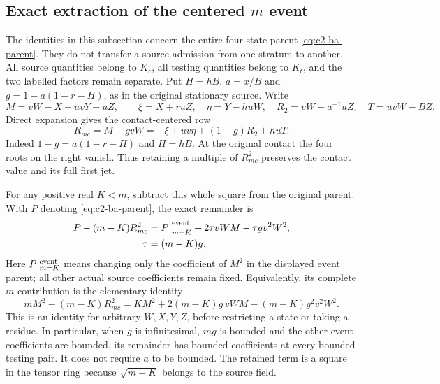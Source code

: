 \subsection{Exact extraction of the centered $m$ event}
\label{component:p8da9ea6ed9e5}
\label{p8da9ea6ed9e5:sec:r17-r5}

The identities in this subsection concern the entire four-state parent
\eqref{eq:c2-ba-parent}. They do not transfer a source admission from one
stratum to another. All source quantities belong to $K_c$, all testing
quantities belong to $K_t$, and the two labelled factors remain separate.
Put $H=hB$, $a=x/B$ and $g=1-a(1-r-H)$, as in the original stationary
source. Write
\[
 M=vW-X+uvY-uZ,\qquad
 \xi=X+ruZ,\quad\eta=Y-huW,\quad
 R_2=vW-a^{-1}uZ,\quad T=uvW-BZ.
\]
Direct expansion gives the contact-centered row
\begin{equation}
 R_{mc}=M-gvW=-\xi+uv\eta+(1-g)R_2+huT.
 \tag{R5.2}\label{eq:c2-r55-centered-row}
\end{equation}
Indeed $1-g=a(1-r-H)$ and $H=hB$. At the original contact the four
roots on the right vanish. Thus retaining a multiple of $R_{mc}^2$
preserves the contact value and its full first jet.

For any positive real $K<m$, subtract this whole square from the
original parent. With $P$ denoting \eqref{eq:c2-ba-parent}, the exact
remainder is
\[
 \begin{split}
 P-(m-K)R_{mc}^2
   &=P\big|^{\rm event}_{m=K}
       +2\tau vWM-\tau g v^2W^2,\\
 \tau&=(m-K)g.
 \end{split}
\]
Here $P|^{\rm event}_{m=K}$ means changing only the coefficient of
$M^2$ in the displayed event parent; all other actual source
coefficients remain fixed. Equivalently, its complete $m$ contribution
is the elementary identity
\begin{equation}
 mM^2-(m-K)R_{mc}^2
   =KM^2+2(m-K)g\,vWM-(m-K)g^2v^2W^2.
 \tag{R5.5}\label{eq:c2-r55-event}
\end{equation}
This is an identity for arbitrary $W,X,Y,Z$, before restricting a
state or taking a residue. In particular, when $g$ is infinitesimal,
$mg$ is bounded and the other event coefficients are bounded, its
remainder has bounded coefficients at every bounded testing pair.
It does not require $a$ to be bounded. The retained term is a square
in the tensor ring because $\sqrt{m-K}$ belongs to the source field.

